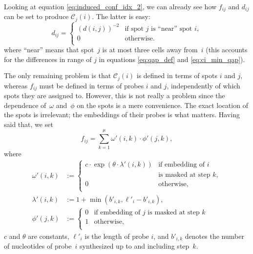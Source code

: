 \documentclass{bioinfo}
\begin{document}
Looking at equation \ref{eq:induced_conf_idx_2}, we can already see how $f_{ij}$ and $d_{ij}$ can be set to produce $\mathcal{C}_j(i)$. The latter is easy:
\begin{equation}
d_{ij} =
	\left\{
                \begin{array}{ll}
                        (d(i,j))^{-2} & \mbox{if spot $j$ is ``near'' spot $i$}, \\
                        0 & \mbox{otherwise}. \\
                \end{array}
	\right.
\end{equation}
where ``near'' means that spot~$j$ is at most three cells away from~$i$ (this accounts for the differences in range of $j$ in equations \ref{eq:qap_def} and \ref{eq:ci_min_qap}).

The only remaining problem is that $\mathcal{C}_j(i)$ is defined in terms of spots $i$ and $j$, whereas $f_{ij}$ must be defined in terms of probes $i$ and $j$, independently of which spots they are assigned to. However, this is not really a problem since the dependence of~$\omega$ and~$\phi$ on the spots is a mere convenience. The exact location of the spots is irrelevant; the embeddings of their probes is what matters. Having said that, we set
\begin{equation}
f_{ij} = \sum_{k=1}^{\mu} \omega'(i,k) \cdot \phi'(j,k),
\end{equation}
where
\begin{align}
\omega'(i,k) &:=
        \left\{
                \begin{array}{ll}
                        c \cdot \exp{\left(\theta \cdot \lambda'(i,k)\right)} &
                            \mbox{if embedding of $i$} \\
                          & \mbox{is masked at step $k$}, \\
                        0 & \mbox{otherwise}, \\
                \end{array}
        \right. \\
\lambda'(i,k) &:= 1 + \min(b'_{i,k},\ell'_{i} - b'_{i,k}), \\
\phi'(j,k) &:=
        \left\{
                \begin{array}{ll}
                        0 & \mbox{if embedding of $j$ is masked at step $k$} \\
                        1 & \mbox{otherwise}, \\
                \end{array}
        \right.
\end{align}
$c$ and $\theta$ are constants, $\ell'_i$ is the length of probe $i$, and $b'_{i,k}$ denotes the number of nucleotides of probe~$i$ synthesized up to and including step~$k$.
\end{document}
